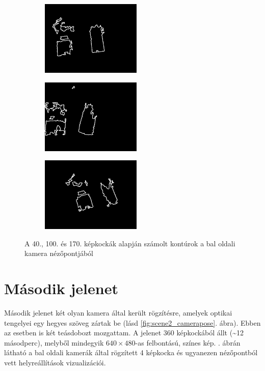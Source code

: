 \begin{figure}[t!]
\begin{subfigure}[b]{.32\linewidth}
	\centering
	\includegraphics[width=135pt]{figures/contour_93.png}
  \end{subfigure}
\begin{subfigure}[b]{.32\linewidth}
	\centering
	\includegraphics[width=135pt]{figures/contour_153.png}
  \end{subfigure}
\begin{subfigure}[b]{.32\linewidth}
	\centering
	\includegraphics[width=135pt]{figures/contour_223.png}
  \end{subfigure}
\caption{A 40., 100. és 170. képkockák alapján számolt kontúrok a bal oldali kamera nézőpontjából \label{fig:scene1_contours}}

\end{figure}

\section{Második jelenet}

Második jelenet két olyan kamera által került rögzítésre, amelyek optikai tengelyei egy hegyes szöveg zártak be (lásd \ref{fig:scene2_camerapose}. ábra). Ebben az esetben is két teásdobozt mozgattam. A jelenet 360 képkockából állt (\textasciitilde 12 másodperc), melyből mindegyik $640\times 480$-as felbontású, színes kép. . ábrán látható a bal oldali kamerák által rögzített 4 képkocka és ugyanezen nézőpontból vett helyreállítások vizualizációi.

